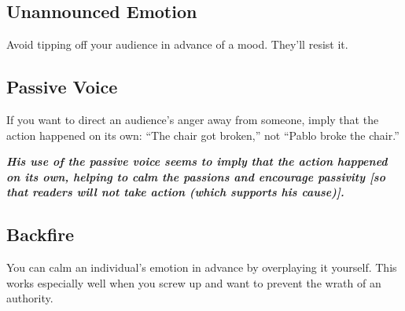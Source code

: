 \subsection{Unannounced Emotion}
Avoid tipping off your audience in advance of a mood. They'll resist it.

\subsection{Passive Voice}
If you want to direct an audience's anger away from someone, imply that the action happened on its own: ``The chair got broken,'' not ``Pablo broke the chair.''

\emph{\textbf{His use of the passive voice seems to imply that the action happened on its own, helping to calm the passions and encourage passivity [so that readers will not take action (which supports his cause)].}}

\subsection{Backfire}
You can calm an individual's emotion in advance by overplaying it yourself. This works especially well when you screw up and want to prevent the wrath of an authority.

